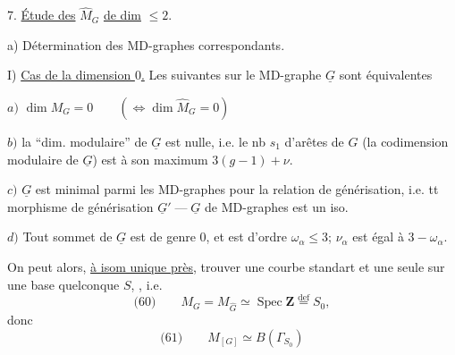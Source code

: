 7. \uline{Étude des}  $\widehat M_G$  \uline{de dim} $\leq 2$.

a) Détermination des MD-graphes correspondants.

I) \uline{Cas de la dimension $0$.} Les   suivantes sur le MD-graphe $\underline G$ sont équivalentes

$a)$ $\dim M_G=0\qquad(\Longleftrightarrow\dim\widehat M_G=0)$

$b)$  la ``dim. modulaire'' de $\underline G$ est nulle, i.e. le nb $s_1$ d'arêtes de  $G$ (la codimension modulaire de $\underline G$) est  à son maximum $3(g-1)+\nu$.

$c)$  $\underline G$ est minimal parmi les MD-graphes pour la relation de générisation, i.e. tt morphisme de générisation $\underline G'\mathbin{\text{---}}\underline G$ de MD-graphes est un iso.

$d)$ Tout sommet \inserted{$\alpha$} de $\underline G$ est de genre $0$, et est d'ordre  $\omega_\alpha\leq3$;   $\nu_\alpha$ est égal à $3-\omega_\alpha$.

On peut alors, \uline{à isom unique près}, trouver une courbe standart  et une seule sur une base quelconque $S$, , i.e.
\[
\text{(60)}\qquad M_G=M_{\widehat G}\simeq\operatorname{Spec}\mathbf Z\overset{\mathrm{def}}=S_0,
\]
donc
\[
\text{(61)}\qquad M_{[G]}\simeq B(\Gamma_{S_0})
\]
